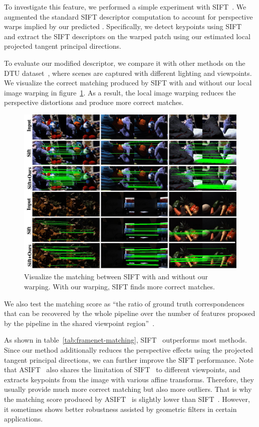 To investigate this feature, we performed a simple experiment with SIFT~\cite{lowe2004distinctive}.  We augmented the standard SIFT descriptor computation to account for perspective warps implied by our predicted \cframes. Specifically, we detect keypoints using SIFT~\cite{lowe2004distinctive} and extract the SIFT descriptors on the warped patch using our estimated local projected tangent principal directions.

To evaluate our modified descriptor, we compare it with other methods on the DTU dataset~\cite{aanaes2012interesting}, where scenes are captured with different lighting and viewpoints. We visualize the correct matching produced by SIFT with and without our local image warping in figure~\ref{fig:framenet-dtu-vis}. As a result, the local image warping reduces the perspective distortions and produce more correct matches.
\begin{figure}
    \centering
    \includegraphics[width=0.8\linewidth]{FrameNet/graph/vis-sift.pdf}
    \caption{Visualize the matching between SIFT with and without our warping. With our warping, SIFT finds more correct matches.}
    \label{fig:framenet-dtu-vis}
\end{figure}
We also test the matching score as ``the ratio of ground truth correspondences that can be recovered by the whole pipeline over the number of features proposed by the pipeline in the shared viewpoint region''~\cite{yi2016lift}.

As shown in table~\ref{tab:framenet-matching}, SIFT~\cite{lowe2004distinctive} outperforms most methods. Since our method additionally reduces the perspective effects using the projected tangent principal directions, we can further improve the SIFT performance. Note that ASIFT~\cite{yu2011asift} also shares the limitation of SIFT~\cite{lowe2004distinctive} to different viewpoints, and extracts keypoints from the image with various affine transforms. Therefore, they usually provide much more correct matching but also more outliers. That is why the matching score produced by ASIFT~\cite{yu2011asift} is slightly lower than SIFT~\cite{lowe2004distinctive}. However, it sometimes shows better robustness assisted by geometric filters in certain applications.

